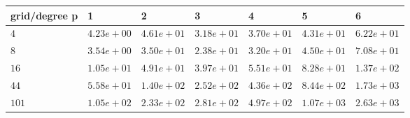 \begin{tabular}{lllllll}
\hline
 grid/degree p   & 1          & 2          & 3          & 4          & 5          & 6          \\
\hline
 $4$             & $4.23e+00$ & $4.61e+01$ & $3.18e+01$ & $3.70e+01$ & $4.31e+01$ & $6.22e+01$ \\
 $8$             & $3.54e+00$ & $3.50e+01$ & $2.38e+01$ & $3.20e+01$ & $4.50e+01$ & $7.08e+01$ \\
 $16$            & $1.05e+01$ & $4.91e+01$ & $3.97e+01$ & $5.51e+01$ & $8.28e+01$ & $1.37e+02$ \\
 $44$            & $5.58e+01$ & $1.40e+02$ & $2.52e+02$ & $4.36e+02$ & $8.44e+02$ & $1.73e+03$ \\
 $101$           & $1.05e+02$ & $2.33e+02$ & $2.81e+02$ & $4.97e+02$ & $1.07e+03$ & $2.63e+03$ \\
\hline
\end{tabular}